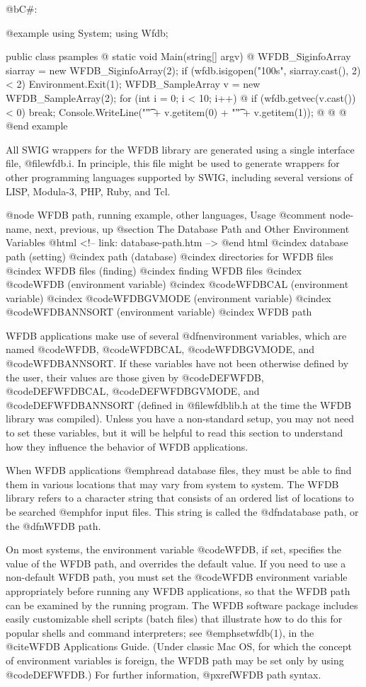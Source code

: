 {{@b{C#:}

@example
using System;
using Wfdb;

public class psamples @{
    static void Main(string[] argv) @{
        WFDB_SiginfoArray siarray = new WFDB_SiginfoArray(2);
        if (wfdb.isigopen("100s", siarray.cast(), 2) < 2)
            Environment.Exit(1);
        WFDB_SampleArray v = new WFDB_SampleArray(2);
        for (int i = 0; i < 10; i++) @{
            if (wfdb.getvec(v.cast()) < 0)
                break;
	    Console.WriteLine("\t" + v.getitem(0) + "\t" + v.getitem(1));
        @}
    @}
@}
@end example

All SWIG wrappers for the WFDB library are generated using a single
interface file, @file{wfdb.i}.  In principle, this file might be used
to generate wrappers for other programming languages supported by SWIG,
including several versions of LISP, Modula-3, PHP, Ruby, and Tcl.

@node     WFDB path, running example, other languages, Usage
@comment  node-name,  next,  previous,  up
@section The Database Path and Other Environment Variables
@html
<!-- link: database-path.htm -->
@end html
@cindex database path (setting)
@cindex path (database)
@cindex directories for WFDB files
@cindex WFDB files (finding)
@cindex finding WFDB files
@cindex @code{WFDB} (environment variable)
@cindex @code{WFDBCAL} (environment variable)
@cindex @code{WFDBGVMODE} (environment variable)
@cindex @code{WFDBANNSORT} (environment variable)
@cindex WFDB path

WFDB applications make use of several @dfn{environment variables}, which are
named @code{WFDB}, @code{WFDBCAL}, @code{WFDBGVMODE}, and @code{WFDBANNSORT}.
If these variables have not been otherwise defined by the user, their values
are those given by @code{DEFWFDB}, @code{DEFWFDBCAL}, @code{DEFWFDBGVMODE},
and @code{DEFWFDBANNSORT} (defined in @file{wfdblib.h} at the
time the WFDB library was compiled).  Unless you have a non-standard
setup, you may not need to set these variables, but it will be helpful
to read this section to understand how they influence the behavior of
WFDB applications.

When WFDB applications @emph{read} database files, they must be able to
find them in various locations that may vary from system to system.  The
WFDB library refers to a character string that consists of an ordered
list of locations to be searched @emph{for input files}.  This string is
called the @dfn{database path}, or the @dfn{WFDB path}.

On most systems, the environment variable @code{WFDB}, if set, specifies
the value of the WFDB path, and overrides the default value.  If you
need to use a non-default WFDB path, you must set the @code{WFDB}
environment variable appropriately before running any WFDB applications,
so that the WFDB path can be examined by the running program.  The WFDB
software package includes easily customizable shell scripts (batch
files) that illustrate how to do this for popular shells and command
interpreters; see @emph{setwfdb}(1), in the @cite{WFDB Applications
Guide}.  (Under classic Mac OS, for which the concept of environment
variables is foreign, the WFDB path may be set only by using
@code{DEFWFDB}.)  For further information, @pxref{WFDB path syntax}.

}}
